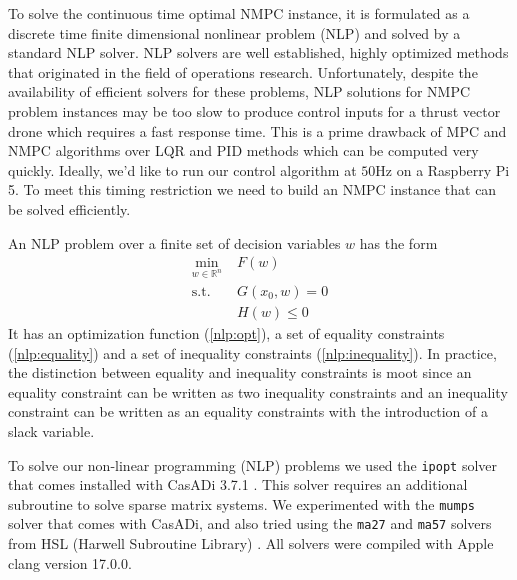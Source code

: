 \documentclass[]{article}
\newcommand{\mpc}{MPC}
\newcommand{\nmpc}{NMPC}
\newcommand{\R}{\mathbb{R}}
\begin{document}
	To solve the continuous time optimal {\nmpc} instance, it is formulated as a discrete time finite dimensional nonlinear problem (NLP) and solved by a standard NLP solver.  NLP solvers are well established, highly optimized methods that originated in the field of operations research. Unfortunately, despite the availability of efficient solvers for these problems, NLP solutions for {\nmpc} problem instances may be too slow to produce control inputs for a thrust vector drone which requires a fast response time. This is a prime drawback of {\mpc} and {\nmpc} algorithms over LQR and PID  methods which can be computed very quickly.
	Ideally, we'd like to run our control algorithm at $50$Hz on a Raspberry Pi 5.  To meet this timing restriction we need to build an {\nmpc} instance that can be solved efficiently. 

	An NLP problem over a finite set of decision variables $w$ has the form 
	\begin{align}
		\min_{w \in \R^n} \; &  F(w) \label{nlp:opt} \\
		\text{s.t.} \;\; & G(x_0, w) = 0 \label{nlp:equality} \\
		&	H(w) \leq 0 \label{nlp:inequality}
	\end{align}
	It has an optimization function (\ref{nlp:opt}),  a set of equality constraints (\ref{nlp:equality}) and a set of inequality constraints (\ref{nlp:inequality}).
	In practice, the distinction between equality and inequality constraints is moot since an equality constraint can be written as two inequality constraints  and  an inequality constraint can be written as an equality constraints with the introduction of a slack variable. 


	To solve our non-linear programming (NLP) problems we used the \texttt{ipopt} solver \citep{ipopt} that comes installed with CasADi 3.7.1 \citep{casadi}.   This solver requires an additional subroutine to  solve sparse matrix systems. We experimented with the \texttt{mumps}  solver that comes with CasADi, and also tried using the  \texttt{ma27} and  \texttt{ma57} solvers  from HSL (Harwell Subroutine Library) \citep{hsl}. All solvers were compiled with Apple clang version 17.0.0.   
	
\end{document}
